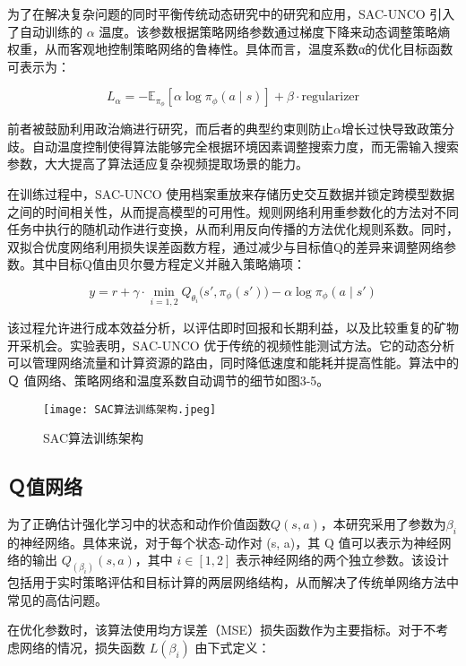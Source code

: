为了在解决复杂问题的同时平衡传统动态研究中的研究和应用，SAC-UNCO 引入了自动训练的 \(α\) 温度。该参数根据策略网络参数通过梯度下降来动态调整策略熵权重，从而客观地控制策略网络的鲁棒性。具体而言，温度系数α的优化目标函数可表示为：

\begin{equation}
	L_{\alpha} = -\mathbb{E}_{\pi_{\phi}} \left[ \alpha \log \pi_{\phi}(a \mid s) \right] + \beta \cdot \text{regularizer}
\end{equation}

前者被鼓励利用政治熵进行研究，而后者的典型约束则防止\(α\)增长过快导致政策分歧。自动温度控制使得算法能够完全根据环境因素调整搜索力度，而无需输入搜索参数，大大提高了算法适应复杂视频提取场景的能力。

在训练过程中，SAC-UNCO 使用档案重放来存储历史交互数据并锁定跨模型数据之间的时间相关性，从而提高模型的可用性。规则网络利用重参数化的方法对不同任务中执行的随机动作进行变换，从而利用反向传播的方法优化规则系数。同时，双拟合优度网络利用损失误差函数方程，通过减少与目标值Q的差异来调整网络参数。其中目标Q值由贝尔曼方程定义并融入策略熵项：

\begin{equation}
	y = r + \gamma \cdot \min_{i=1,2} Q_{\theta_i}\big(s', \pi_\phi(s')\big) - \alpha \log \pi_\phi(a \mid s')
\end{equation}

该过程允许进行成本效益分析，以评估即时回报和长期利益，以及比较重复的矿物开采机会。实验表明，SAC-UNCO 优于传统的视频性能测试方法。它的动态分析可以管理网络流量和计算资源的路由，同时降低速度和能耗并提高性能。算法中的 Ｑ 值网络、策略网络和温度系数自动调节的细节如图3-5。

\begin{figure}[hbt]
	\centering
	\texttt{[image: SAC算法训练架构.jpeg]}
	\caption{SAC算法训练架构}
	\label{f.example}
\end{figure}


\subsection{Ｑ值网络}

为了正确估计强化学习中的状态和动作价值函数\(Q(s,a)\)，本研究采用了参数为\(β_i\)的神经网络。具体来说，对于每个状态-动作对 (s, a)，其 Q 值可以表示为神经网络的输出 \(Q_(β_i)(s, a)\)，其中 \(i∈[1,2]\) 表示神经网络的两个独立参数。该设计包括用于实时策略评估和目标计算的两层网络结构，从而解决了传统单网络方法中常见的高估问题。

在优化参数时，该算法使用均方误差（MSE）损失函数作为主要指标。对于不考虑网络的情况，损失函数 \(L(β_i)\) 由下式定义：


